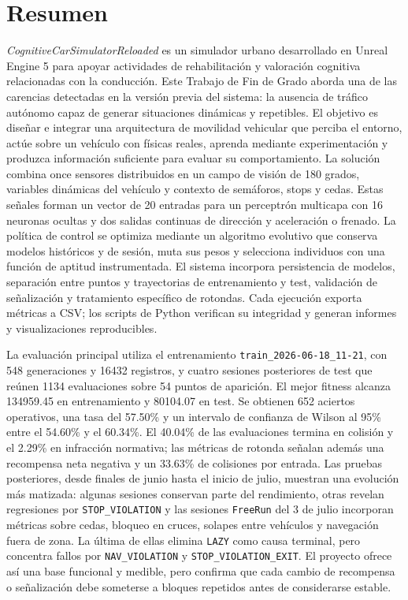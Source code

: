 \endgroup

\cleardoublepage%
\chapter*{Resumen}

\textit{CognitiveCarSimulatorReloaded} es un simulador urbano desarrollado en Unreal Engine 5 para apoyar actividades de rehabilitación y valoración cognitiva relacionadas con la conducción. Este Trabajo de Fin de Grado aborda una de las carencias detectadas en la versión previa del sistema: la ausencia de tráfico autónomo capaz de generar situaciones dinámicas y repetibles. El objetivo es diseñar e integrar una arquitectura de movilidad vehicular que perciba el entorno, actúe sobre un vehículo con físicas reales, aprenda mediante experimentación y produzca información suficiente para evaluar su comportamiento. La solución combina once sensores distribuidos en un campo de visión de 180 grados, variables dinámicas del vehículo y contexto de semáforos, stops y cedas. Estas señales forman un vector de 20 entradas para un perceptrón multicapa con 16 neuronas ocultas y dos salidas continuas de dirección y aceleración o frenado. La política de control se optimiza mediante un algoritmo evolutivo que conserva modelos históricos y de sesión, muta sus pesos y selecciona individuos con una función de aptitud instrumentada. El sistema incorpora persistencia de modelos, separación entre puntos y trayectorias de entrenamiento y test, validación de señalización y tratamiento específico de rotondas. Cada ejecución exporta métricas a CSV\@; los scripts de Python verifican su integridad y generan informes y visualizaciones reproducibles.

La evaluación principal utiliza el entrenamiento \texttt{train\_2026-06-18\_11-21}, con 548 generaciones y 16432 registros, y cuatro sesiones posteriores de test que reúnen 1134 evaluaciones sobre 54 puntos de aparición. El mejor fitness alcanza 134959.45 en entrenamiento y 80104.07 en test. Se obtienen 652 aciertos operativos, una tasa del 57.50\% y un intervalo de confianza de Wilson al 95\% entre el 54.60\% y el 60.34\%. El 40.04\% de las evaluaciones termina en colisión y el 2.29\% en infracción normativa; las métricas de rotonda señalan además una recompensa neta negativa y un 33.63\% de colisiones por entrada. Las pruebas posteriores, desde finales de junio hasta el inicio de julio, muestran una evolución más matizada: algunas sesiones conservan parte del rendimiento, otras revelan regresiones por \texttt{STOP\_VIOLATION} y las sesiones \texttt{FreeRun} del 3 de julio incorporan métricas sobre cedas, bloqueo en cruces, solapes entre vehículos y navegación fuera de zona. La última de ellas elimina \texttt{LAZY} como causa terminal, pero concentra fallos por \texttt{NAV\_VIOLATION} y \texttt{STOP\_VIOLATION\_EXIT}. El proyecto ofrece así una base funcional y medible, pero confirma que cada cambio de recompensa o señalización debe someterse a bloques repetidos antes de considerarse estable.

